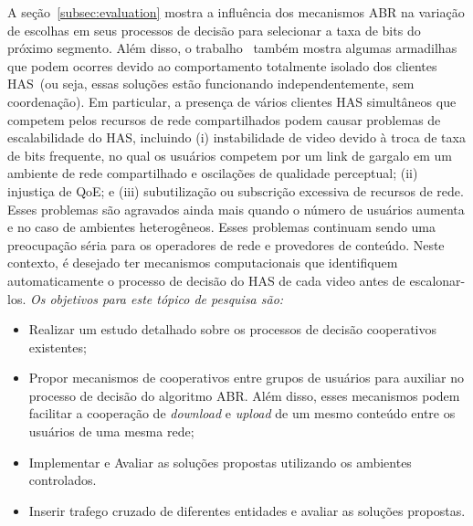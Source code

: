 A seção~\ref{subsec:evaluation} mostra a influência dos mecanismos ABR na variação de escolhas em seus processos de decisão para selecionar a taxa de bits do próximo segmento. Além disso, o trabalho~\cite{bentaleb:2018:MSys} também mostra algumas armadilhas que podem ocorres devido ao comportamento totalmente isolado dos clientes HAS~(ou seja, essas soluções estão funcionando independentemente, sem coordenação). Em particular, a presença de vários clientes HAS simultâneos que competem pelos recursos de rede compartilhados podem causar problemas de escalabilidade do HAS, incluindo (i) instabilidade de video devido à troca de taxa de bits frequente, no qual os usuários competem por um link de gargalo em um ambiente de rede compartilhado e oscilações de qualidade perceptual; (ii) injustiça de QoE; e (iii) subutilização ou subscrição excessiva de recursos de rede. Esses problemas são agravados ainda mais quando o número de usuários aumenta e no caso de ambientes heterogêneos. Esses problemas continuam sendo uma preocupação séria para os operadores de rede e provedores de conteúdo. 
Neste contexto, é desejado ter mecanismos computacionais que identifiquem automaticamente o processo de decisão do HAS de cada video antes de escalonar-los.
\textit{Os objetivos para este tópico de pesquisa são:}

\begin{itemize}
    \item Realizar um estudo detalhado sobre os processos de decisão cooperativos existentes;
    \item Propor mecanismos de cooperativos entre grupos de usuários para auxiliar no processo de decisão do algoritmo ABR. Além disso, esses mecanismos podem facilitar a cooperação de \textit{download} e \textit{upload} de um mesmo conteúdo entre os usuários de uma mesma rede; 
    \item Implementar e Avaliar as soluções propostas utilizando os ambientes controlados.
    \item Inserir trafego cruzado de diferentes entidades e avaliar as soluções propostas.
\end{itemize}



